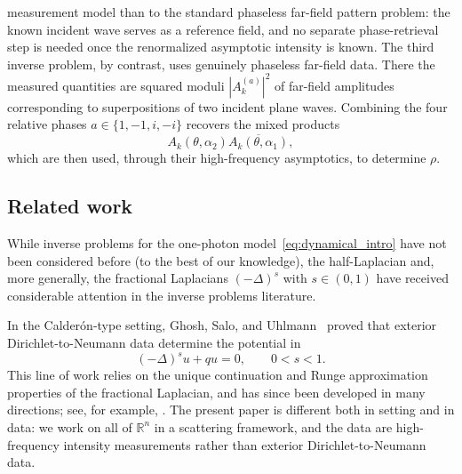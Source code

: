 \documentclass[12pt,a4paper]{amsart}
\numberwithin{equation}{section}
\theoremstyle{plain}
\theoremstyle{definition}
\begin{document}
measurement model than to the standard phaseless far-field pattern problem:
the known incident wave serves as a reference field, and no separate
phase-retrieval step is needed once the renormalized asymptotic intensity is
known. The third inverse problem, by contrast, uses genuinely phaseless far-field
data. There the measured quantities are squared moduli
$|A_k^{(a)}|^2$ of far-field amplitudes corresponding to superpositions of
two incident plane waves. Combining the four relative phases
$a\in\{1,-1,i,-i\}$ recovers the mixed products
\begin{equation*}
    A_k(\theta,\alpha_2)\overline{A_k(\theta,\alpha_1)},
\end{equation*}
which are then used, through their high-frequency asymptotics, to determine
$\rho$.
















\subsection{Related work}

While inverse problems for the one-photon model~\eqref{eq:dynamical_intro}
have not been considered before (to the best of our knowledge), the half-Laplacian and, more
generally, the fractional Laplacians $(-\Delta)^s$ with $s\in(0,1)$ have
received considerable attention in the inverse problems literature.

In the Calder\'on-type setting, Ghosh, Salo,
and Uhlmann~\cite{Ghosh_Salo_Uhlmann_2020} proved that exterior
Dirichlet-to-Neumann data determine the potential in
\begin{equation*}
    (-\Delta)^s u+q u=0,\qquad 0<s<1.
\end{equation*}
This line of work relies on the unique continuation and Runge approximation
properties of the fractional Laplacian, and has since been developed in many
directions; see, for example,
\cite{Ruland_Salo_2020,Cekic_Lin_Ruland_2020,Covi_2020,
Ghosh_Ruland_Salo_Uhlmann_2021}. The present paper is different both in
setting and in data: we work on all of $\mathbb R^n$ in a scattering
framework, and the data are high-frequency intensity measurements rather
than exterior Dirichlet-to-Neumann data.
\end{document}
